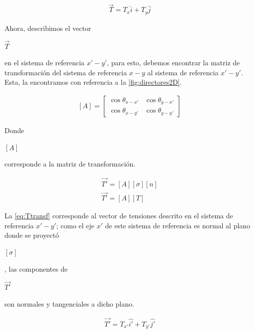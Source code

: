 \documentclass[12pt,letterpaper, twoside, openany]{article}
\begin{document}
%
\begin{large}
	\begin{align}
		\overset{\rightarrow}{T}= T_x \hat{i} + T_y \hat{j}
		\label{eq:Tcomp}
	\end{align}
\end{large}
%
Ahora, describimos el vector \begin{large} $\overset{\rightarrow}{T}$\end{large} en el sistema de referencia $x'-y'$, para esto, debemos encontrar la matriz de transformación del sistema de referencia $x-y$ al sistema de referencia $x'-y'$. Esta, la encontramos con referencia a la \cref{fig:directores2D}.
%
\begin{large}
	\begin{align}
		\left[A\right]=
		\left[ \begin{array}{cc}
		\cos \theta_{x-x'} & \cos \theta_{y-x'} \\  
		\cos \theta_{x-y'} & \cos \theta_{y-y'}
		\end{array}  \right] 
		\label{eq:transfoma2D}
	\end{align}
\end{large}
%
Donde \begin{large} $\left[ A \right]$\end{large} corresponde a la matriz de transformación.
%
 \begin{large}
	\begin{align}
		\overset{\rightarrow}{T'}= \left[ A \right] \left[ \sigma \right] \left[ n \right]\label{eq:Ttransf0}\\
		\overset{\rightarrow}{T'}= \left[ A \right] \left[ T \right]
		\label{eq:Ttransf}
	\end{align}
\end{large}
%
La \cref{eq:Ttransf} corresponde al vector de tensiones descrito en el sistema de referencia $x'-y'$; como el eje $x'$ de este sistema de referencia es normal al plano donde se proyectó \begin{large} $\left[ \sigma \right]$\end{large}, las componentes de \begin{large} $\overset{\rightarrow}{T'}$\end{large} son normales y tangenciales a dicho plano.
%
\begin{large}
	\begin{align}
		\overset{\rightarrow}{T'}= T_{x'} \hat{i'} + T_{y' }\hat{j'}
		\label{eq:TPcomp}
	\end{align}
\end{large}
\end{document}
